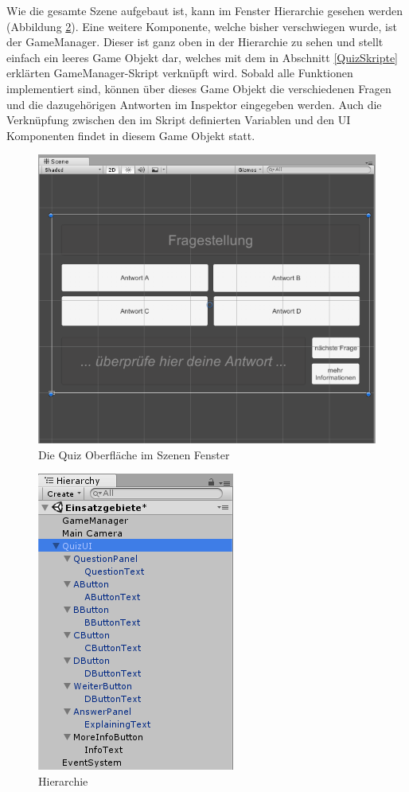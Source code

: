 Wie die gesamte Szene aufgebaut ist, kann im Fenster Hierarchie gesehen werden (Abbildung \ref{HierarchiePc}). Eine weitere Komponente, welche bisher verschwiegen wurde, ist der GameManager. Dieser ist ganz oben in der Hierarchie zu sehen und stellt einfach ein leeres Game Objekt dar, welches mit dem in Abschnitt \ref{QuizSkripte} erklärten GameManager-Skript verknüpft wird. Sobald alle Funktionen implementiert sind, können über dieses Game Objekt die verschiedenen Fragen und die dazugehörigen Antworten im Inspektor eingegeben werden. Auch die Verknüpfung zwischen den im Skript definierten Variablen und den UI Komponenten findet in diesem Game Objekt statt.

\begin{figure}
\centering
\includegraphics[scale=0.8]{bilder/QuizOberflaecheSzene.PNG}
\caption{Die Quiz Oberfläche im Szenen Fenster}
\label{QuizOberflaechePc}
\end{figure}

\begin{figure}
\centering
\includegraphics[scale=1]{bilder/Hierarchie.PNG}
\caption{Hierarchie}
\label{HierarchiePc}
\end{figure}

